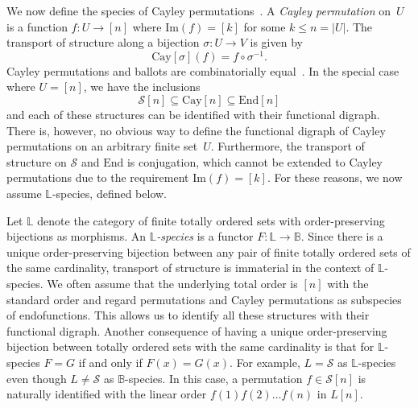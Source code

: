 \documentclass[a4paper,11pt,UKenglish]{article}
\newcommand{\LL}{\mathbb{L}}
\newcommand{\BB}{\mathbb{B}}
\newcommand{\Lin}{L}
\newcommand{\Sym}{\mathcal{S}}
\newcommand{\End}{\mathrm{End}}
\newcommand{\Bal}{\mathrm{Bal}}
\newcommand{\Cay}{\mathrm{Cay}}
\newcommand{\Img}{\mathrm{Im}}
\theoremstyle{definition}
\begin{document}
We now define the species of Cayley permutations~\cite{CCEG}.
A \emph{Cayley permutation} on~$U$ is a function $f:U\rightarrow [n]$
where $\Img(f)=[k]$ for some $k\leq n=|U|$.
The transport of structure along a bijection $\sigma: U \to V$ is given by
$$
\Cay[\sigma](f)=f\circ\sigma^{-1}.
$$
Cayley permutations and ballots are combinatorially equal~\cite{CCEG}.
In the special case where $U=[n]$, we have the inclusions
$$
\Sym[n]\subseteq\Cay[n]\subseteq\End[n]
$$
and each of these structures can be identified with their functional digraph.
There is, however, no obvious way to define the functional digraph
of Cayley permutations on an arbitrary finite set~$U$. Furthermore,
the transport of structure on $\Sym$ and $\End$ is conjugation, which
cannot be extended to Cayley permutations due to the requirement
$\Img(f)=[k]$. For these reasons, we now assume
$\LL$-species, defined below.

Let $\LL$ denote the category of finite totally ordered sets with
order-preserving bijections as morphisms. An \emph{$\LL$-species} is
a functor $F:\LL\to\BB$. Since there is a unique order-preserving bijection
between any pair of finite totally ordered sets of the same cardinality,
transport of structure is immaterial in the context of $\LL$-species. We often
assume that the underlying total order is $[n]$ with the standard
order and regard permutations and Cayley permutations as subspecies of
endofunctions. This allows us to identify all these structures with
their functional digraph.
Another consequence of having a unique order-preserving bijection
between totally ordered sets with the same cardinality is that for
$\LL$-species $F=G$ if and only if $F(x)=G(x)$.
For example, $\Lin=\Sym$ as $\LL$-species even though $\Lin\neq\Sym$
as $\BB$-species. In this case, a permutation $f\in\Sym[n]$ is
naturally identified with the linear order $f(1)f(2)\ldots f(n)$
in $\Lin[n]$.
\end{document}
